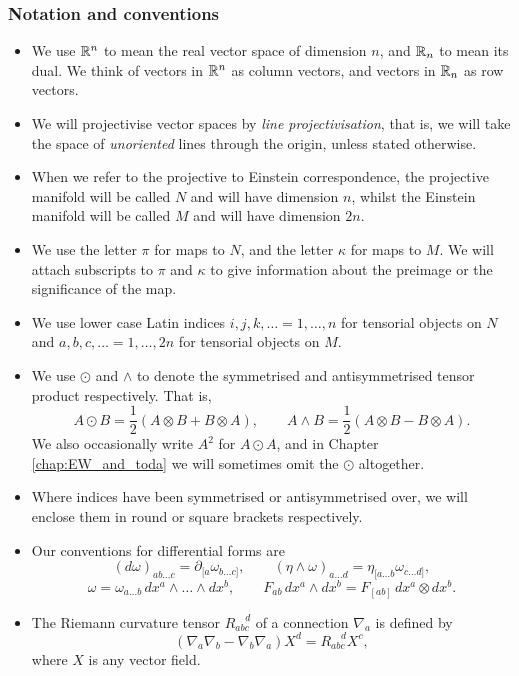 \subsubsection{Notation and conventions}
\begin{itemize}
\item We use $\mathbb{R}^n$ to mean the real vector space of dimension $n$, and $\mathbb{R}_n$ to mean its dual. We think of vectors in $\mathbb{R}^n$ as column vectors, and vectors in $\mathbb{R}_n$ as row vectors.
\item We will projectivise vector spaces by \textit{line projectivisation}, that is, we will take the space of \textit{unoriented} lines through the origin, unless stated otherwise.
\item When we refer to the projective to Einstein correspondence, the projective manifold will be called $N$ and will have dimension $n$, whilst the Einstein manifold will be called $M$ and will have dimension $2n$.
\item We use the letter $\pi$ for maps to $N$, and the letter $\kappa$ for maps to $M$. We will attach subscripts to $\pi$ and $\kappa$ to give information about the preimage or the significance of the map.
\item We use lower case Latin indices $i,j,k,\dots=1,\dots,n$ for tensorial objects on $N$ and $a,b,c,\dots=1,\dots,2n$ for tensorial objects on $M$.
\item We use $\odot$ and $\wedge$ to denote the symmetrised and antisymmetrised tensor product respectively. That is,
\[
A\odot B = \frac{1}{2}(A\otimes B + B\otimes A),\qquad A\wedge B = \frac{1}{2}(A\otimes B - B\otimes A).
\]
We also occasionally write $A^2$ for $A\odot A$, and in Chapter \ref{chap:EW_and_toda} we will sometimes omit the $\odot$ altogether.
\item Where indices have been symmetrised or antisymmetrised over, we will enclose them in round or square brackets respectively.
\item Our conventions for differential forms are
\[
(d\omega)_{ab\dots c}=\partial_{[a}\omega_{b\dots c]},\qquad (\eta\wedge\omega)_{a\dots d}=\eta_{[a\dots b}\omega_{c\dots d]},\]
\[
\omega=\omega_{a\dots b}\,dx^{a}\wedge\dots\wedge dx^{b}, \qquad F_{ab}\,{d}x^{a}\wedge{d}x^{b}=F_{[ab]}\,{d}x^{a}\otimes{d}x^{b}.
\]
\item The Riemann curvature tensor $R_{abc}^{\quad d}$ of a connection $\nabla_a$ is defined by
\[
(\nabla_a\nabla_b - \nabla_b\nabla_a)X^d = R_{abc}^{\quad d}X^c,
\]
where $X$ is any vector field.
\end{itemize}


